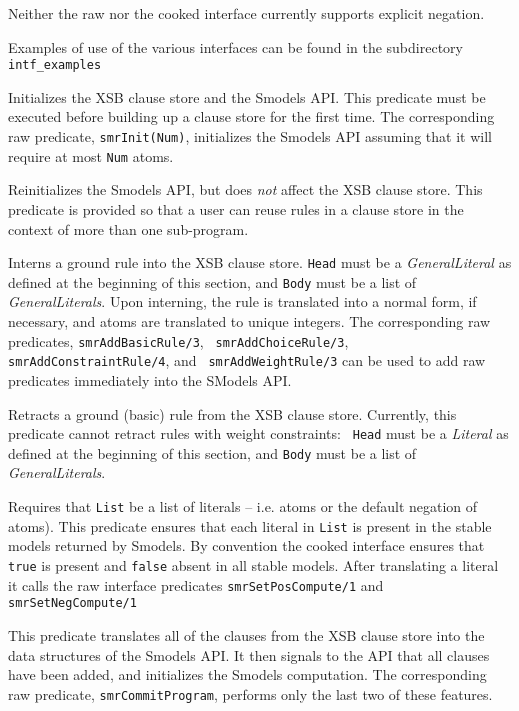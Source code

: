 Neither the raw nor the cooked interface currently supports explicit
negation.

Examples of use of the various interfaces can be found in the
subdirectory {\tt intf\_examples}

\begin{description}
%
Initializes the XSB clause store and the Smodels API.  This predicate
must be executed before building up a clause store for the first time.
The corresponding raw predicate, {\tt smrInit(Num)}, initializes the
Smodels API assuming that it will require at most {\tt Num} atoms.

%
Reinitializes the Smodels API, but does \emph{not} affect the XSB
clause store.  This predicate is provided so that a user can reuse
rules in a clause store in the context of more than one sub-program.

%
Interns a ground rule into the XSB clause store.  {\tt Head} must be a
\emph{GeneralLiteral} as defined at the beginning of this section, and
     {\tt Body} must be a list of \emph{GeneralLiterals}.  Upon
     interning, the rule is translated into a normal form, if
     necessary, and atoms are translated to unique integers.  The
     corresponding raw predicates, {\tt smrAddBasicRule/3}, {\tt
       smrAddChoiceRule/3}, {\tt smrAddConstraintRule/4}, and {\tt
       smrAddWeightRule/3} can be used to add raw predicates
     immediately into the SModels API.

%
Retracts a ground (basic) rule from the XSB clause store.  Currently,
this predicate cannot retract rules with weight constraints: {\tt
  Head} must be a \emph{Literal} as defined at the beginning of this
section, and {\tt Body} must be a list of \emph{GeneralLiterals}.

%
Requires that {\tt List} be a list of literals -- i.e. atoms or the
default negation of atoms).  This predicate ensures that each literal
in {\tt List} is present in the stable models returned by Smodels.  By
convention the cooked interface ensures that {\tt true} is present and
{\tt false} absent in all stable models.  After translating a literal
it calls the raw interface predicates {\tt smrSetPosCompute/1} and
{\tt smrSetNegCompute/1}

%
This predicate translates all of the clauses from the XSB clause store
into the data structures of the Smodels API.  It then signals to the
API that all clauses have been added, and initializes the Smodels
computation.  The corresponding raw predicate, {\tt smrCommitProgram},
performs only the last two of these features.


\end{description}
